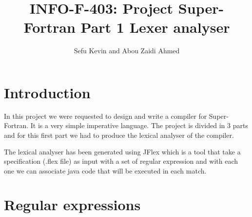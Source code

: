 \documentclass[12pt]{article}
\title{INFO-F-403: Project Super-Fortran Part 1 Lexer analyser}
\author{Sefu Kevin and Abou Zaidi Ahmed}
\begin{document}
\maketitle
\section{Introduction}
In this project we were requested to design and write a compiler for Super-Fortran. It is a very simple 
imperative language. The project is divided in 3 parts and for this first part we had to produce 
the lexical analyser of the compiler.

The lexical analyser has been generated using JFlex which is a tool that take a specification (.flex file)
as input with a set of regular expression and with each one we can associate java code that will
be executed in each match.

\section{Regular expressions}
\end{document}
